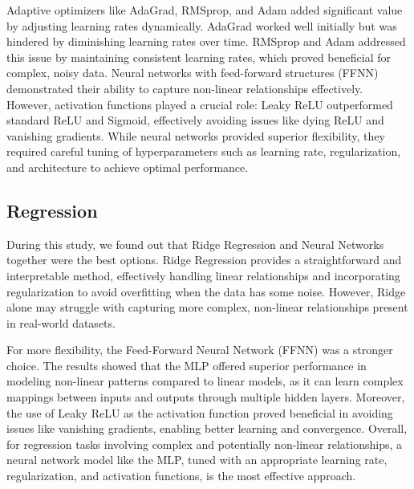 Adaptive optimizers like AdaGrad, RMSprop, and Adam added significant value by adjusting learning rates dynamically. AdaGrad worked well initially but was hindered by diminishing learning rates over time. RMSprop and Adam addressed this issue by maintaining consistent learning rates, which proved beneficial for complex, noisy data. Neural networks with feed-forward structures (FFNN) demonstrated their ability to capture non-linear relationships effectively. However, activation functions played a crucial role: Leaky ReLU outperformed standard ReLU and Sigmoid, effectively avoiding issues like dying ReLU and vanishing gradients. While neural networks provided superior flexibility, they required careful tuning of hyperparameters such as learning rate, regularization, and architecture to achieve optimal performance.


\subsection{Regression}

During this study, we found out that Ridge Regression and Neural Networks together were the best options. Ridge Regression provides a straightforward and interpretable method, effectively handling linear relationships and incorporating regularization to avoid overfitting when the data has some noise. However, Ridge alone may struggle with capturing more complex, non-linear relationships present in real-world datasets.

For more flexibility, the Feed-Forward Neural Network (FFNN) was a stronger choice. The results showed that the MLP offered superior performance in modeling non-linear patterns compared to linear models, as it can learn complex mappings between inputs and outputs through multiple hidden layers. Moreover, the use of Leaky ReLU as the activation function proved beneficial in avoiding issues like vanishing gradients, enabling better learning and convergence. Overall, for regression tasks involving complex and potentially non-linear relationships, a neural network model like the MLP, tuned with an appropriate learning rate, regularization, and activation functions, is the most effective approach.



